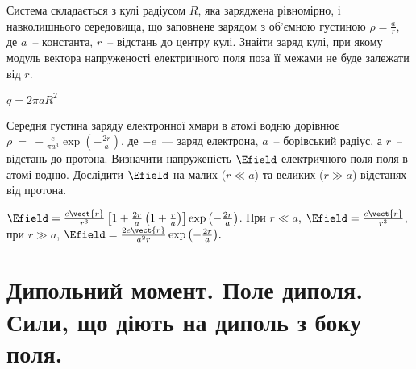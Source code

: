 \begin{problem}
Система складається з кулі радіусом $R$, яка заряджена рівномірно, і навколишнього середовища, що заповнене зарядом з об'ємною густиною $\rho = \frac{a}{r}$, де $a$~-- константа, $r$~-- відстань до центру кулі. Знайти заряд кулі, при якому модуль вектора напруженості електричного поля поза її межами не буде залежати від $r$.
\begin{solution}
	$q = 2\pi a R^2$
\end{solution}
\end{problem}

\begin{problem}
Середня густина заряду електронної хмари в атомі водню дорівнює $\rho~=~-\frac{e}{\pi a^3}\exp{\left( -\frac{2r}{a}\right) }$, де $-e$~--- заряд електрона, $a$~-- борівський радіус, а $r$~-- відстань до протона. Визначити напруженість $\Efield$ електричного поля поля в атомі водню. Дослідити $\Efield$ на малих ($r\ll a$) та  великих ($r \gg a$) відстанях від протона.
\begin{solution}
	$\Efield = \frac{e\vect{r}}{r^3} \left[ 1 + \frac{2r}{a} \left( 1 + \frac{r}{a} \right) \right]\exp{\left( -\frac{2r}{a}\right) }$. При $r\ll a$, $\Efield = \frac{e\vect{r}}{r^3}$, при $r \gg a$, $\Efield = \frac{2e\vect{r}}{a^2r}\exp{\left( -\frac{2r}{a}\right) }.$
\end{solution}
\end{problem}

\section{Дипольний момент. Поле диполя. Сили, що діють на диполь з боку поля.}

